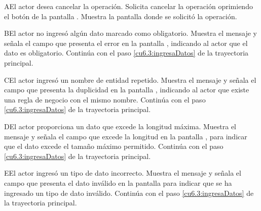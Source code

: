  \begin{UCtrayectoriaA}{A}{El actor desea cancelar la operación.}
    \UCpaso[\UCactor] Solicita cancelar la operación oprimiendo el botón  de la pantalla .
    \UCpaso[\UCsist] Muestra la pantalla donde se solicitó la operación.
 \end{UCtrayectoriaA} 
 \begin{UCtrayectoriaA}{B}{El actor no ingresó algún dato marcado como obligatorio.}
    \UCpaso[\UCsist] Muestra el mensaje  y señala el campo que presenta el error en la pantalla 
	    , indicando al actor que el dato es obligatorio.
    \UCpaso[] Continúa con el paso \ref{cu6.3:ingresaDatos} de la trayectoria principal.
 \end{UCtrayectoriaA}
 \begin{UCtrayectoriaA}{C}{El actor ingresó un nombre de entidad repetido.}
    \UCpaso[\UCsist] Muestra el mensaje  y señala el campo que presenta la duplicidad en la pantalla 
	    , indicando al actor que existe una regla de negocio con el mismo nombre.
    \UCpaso[] Continúa con el paso \ref{cu6.3:ingresaDatos} de la trayectoria principal.
 \end{UCtrayectoriaA}
 
 \begin{UCtrayectoriaA}{D}{El actor proporciona un dato que excede la longitud máxima.}
    \UCpaso[\UCsist] Muestra el mensaje  y señala el campo que excede la 
    longitud en la pantalla , para indicar que el dato excede el tamaño máximo permitido.
    \UCpaso[] Continúa con el paso \ref{cu6.3:ingresaDatos} de la trayectoria principal.
 \end{UCtrayectoriaA}
 
 \begin{UCtrayectoriaA}{E}{El actor ingresó un tipo de dato incorrecto.}
    \UCpaso[\UCsist] Muestra el mensaje  y señala el campo que presenta el dato inválido en la 
    pantalla  para indicar que se ha ingresado un tipo de dato inválido.
    \UCpaso[] Continúa con el paso \ref{cu6.3:ingresaDatos} de la trayectoria principal.
 \end{UCtrayectoriaA}

